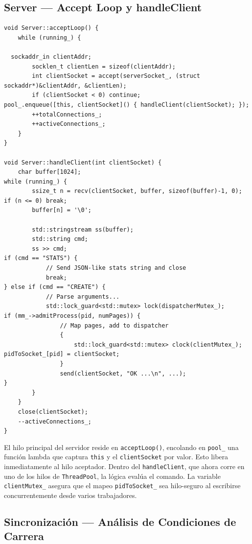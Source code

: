 \documentclass[12pt,letterpaper]{article}
\begin{document}
\subsection{Server --- Accept Loop y handleClient}

\begin{tcolorbox}[codebox, title={Server::acceptLoop() y Server::handleClient()}]
\begin{lstlisting}
void Server::acceptLoop() {
    while (running_) {

  sockaddr_in clientAddr;
        socklen_t clientLen = sizeof(clientAddr);
        int clientSocket = accept(serverSocket_, (struct sockaddr*)&clientAddr, &clientLen);
        if (clientSocket < 0) continue;
pool_.enqueue([this, clientSocket]() { handleClient(clientSocket); });
        ++totalConnections_;
        ++activeConnections_;
    }
}

void Server::handleClient(int clientSocket) {
    char buffer[1024];
while (running_) {
        ssize_t n = recv(clientSocket, buffer, sizeof(buffer)-1, 0);
if (n <= 0) break;
        buffer[n] = '\0';

        std::stringstream ss(buffer);
        std::string cmd;
        ss >> cmd;
if (cmd == "STATS") {
            // Send JSON-like stats string and close
            break;
} else if (cmd == "CREATE") {
            // Parse arguments...
            std::lock_guard<std::mutex> lock(dispatcherMutex_);
if (mm_->admitProcess(pid, numPages)) {
                // Map pages, add to dispatcher
                {
                    std::lock_guard<std::mutex> clock(clientMutex_);
pidToSocket_[pid] = clientSocket;
                }
                send(clientSocket, "OK ...\n", ...);
}
        }
    }
    close(clientSocket);
    --activeConnections_;
}
\end{lstlisting}
\end{tcolorbox}
El hilo principal del servidor reside en \texttt{acceptLoop()}, encolando en \texttt{pool\_} una función lambda que captura \texttt{this} y el \texttt{clientSocket} por valor.
Esto libera inmediatamente al hilo aceptador. Dentro del \texttt{handleClient}, que ahora corre en uno de los hilos de \texttt{ThreadPool}, la lógica evalúa el comando.
La variable \texttt{clientMutex\_} asegura que el mapeo \texttt{pidToSocket\_} sea hilo-seguro al escribirse concurrentemente desde varios trabajadores.
\subsection{Sincronización --- Análisis de Condiciones de Carrera}
\end{document}
